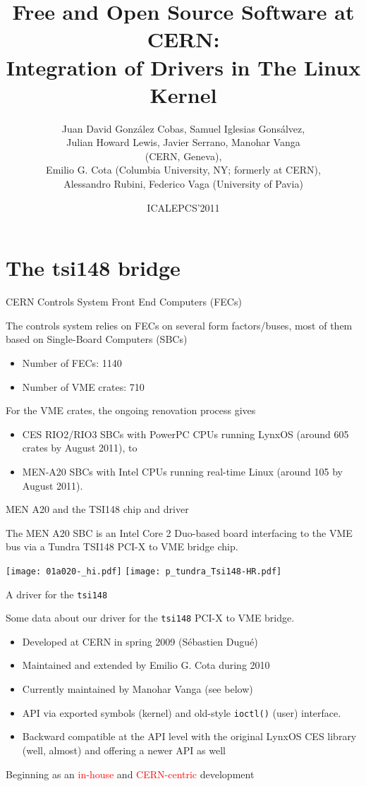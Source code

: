 \documentclass[compress,red]{beamer}
\title[FOSS at CERN: Drivers in the Kernel]%
	{Free and Open Source Software at CERN:\\
	Integration of Drivers in The Linux Kernel}
\author[David Cobas et al.]{%
	Juan David Gonz\'alez Cobas, Samuel Iglesias Gons\'alvez,\\
	Julian Howard Lewis, Javier Serrano, Manohar Vanga\\
		(CERN, Geneva),\\
	Emilio G. Cota (Columbia University, NY; formerly at CERN),\\
	Alessandro Rubini, Federico Vaga (University of Pavia)}
\date{ICALEPCS'2011}
\begin{document}
\begin{frame}
\titlepage
\end{frame}

\section{The tsi148 bridge}
\begin{frame}{CERN Controls System Front End Computers (FECs)}

The controls system relies on FECs on several form factors/buses,
most of them based on Single-Board Computers (SBCs)

\begin{itemize}
\item Number of FECs: 1140
\item Number of VME crates: 710
\end{itemize}

For the VME crates, the ongoing renovation process gives
\begin{itemize}
\item CES RIO2/RIO3 SBCs with PowerPC CPUs running
LynxOS (around 605 crates by August 2011), to
\item MEN-A20 SBCs with Intel CPUs running real-time
Linux (around 105 by August 2011).
\end{itemize}
\end{frame}


\begin{frame}{MEN A20 and the TSI148 chip and driver}

The MEN A20 SBC is an Intel Core 2 Duo-based board interfacing to the
VME bus via a Tundra TSI148 PCI-X to VME bridge chip.

\begin{center}
\texttt{[image: 01a020-\_hi.pdf]} \qquad
\texttt{[image: p\_tundra\_Tsi148-HR.pdf]}
\end{center}
\end{frame}

\begin{frame}{A driver for the \texttt{tsi148}}

Some data about our driver for the \texttt{tsi148} PCI-X to VME bridge.
\begin{itemize}
\pause\item Developed at CERN in spring 2009 (S\'ebastien Dugu\'e)
\pause\item Maintained and extended by Emilio G. Cota during 2010
\pause\item Currently maintained by Manohar Vanga (see below)
\pause\item API via exported symbols (kernel) and old-style \texttt{ioctl()} (user) interface.
\pause\item Backward compatible at the API level with the original LynxOS CES
    library (well, almost) and offering a newer API as well
\end{itemize}

\pause Beginning as an \textcolor{red}{in-house}
and \textcolor{red}{CERN-centric} development
\end{frame}
\end{document}
